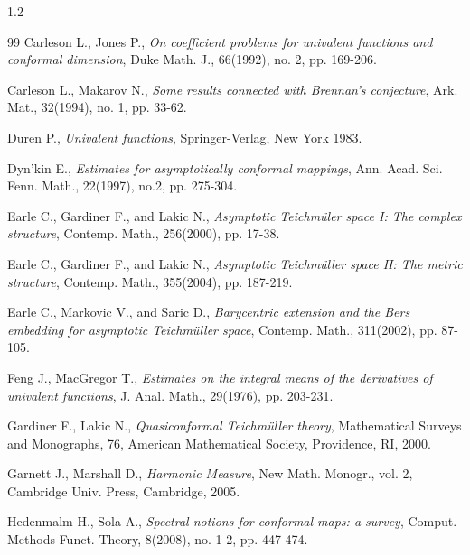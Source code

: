 \documentclass[11pt]{amsart}
\theoremstyle{remark}
\theoremstyle{claim}
\theoremstyle{definition}
\theoremstyle{problem}
\theoremstyle{conjecture}
\theoremstyle{question}
\numberwithin{equation}{section}
\begin{document}
\begin{spacing}{1.2}
\begin{thebibliography}{99}
Carleson L., Jones P., {\em On coefficient problems for univalent functions and conformal 
dimension},  Duke Math. J.,  66(1992), no. 2, pp. 169-206.

Carleson L., Makarov N.,  {\em Some results connected with Brennan's conjecture},  Ark. Mat., 32(1994), no. 1, pp. 33-62.



 Duren P., {\em Univalent functions}, Springer-Verlag, New York 1983.

 Dyn'kin E., {\em Estimates for asymptotically conformal mappings},  Ann. Acad. Sci. Fenn. Math., 22(1997), no.2, pp. 275-304.

Earle C., Gardiner F., and Lakic N., {\em Asymptotic Teichm\"uler space I: The complex structure},  Contemp. Math.,  256(2000), pp. 17-38.

Earle C., Gardiner F., and Lakic N., {\em Asymptotic Teichm\"uller space II: The metric structure}, Contemp. Math., 355(2004), pp. 187-219.

Earle C., Markovic V., and Saric D., {\em Barycentric extension and the Bers embedding for asymptotic Teichm\"uller space},  Contemp. Math., 311(2002), pp. 87-105.

Feng J., MacGregor T., {\em Estimates on the integral means of the derivatives of
univalent functions}, J. Anal. Math., 29(1976), pp. 203-231.

Gardiner F., Lakic N., {\em Quasiconformal Teichm\"uller theory}, Mathematical Surveys and Monographs, 76,  American Mathematical Society, Providence, RI, 2000.



Garnett J., Marshall D., {\em Harmonic Measure}, New Math. Monogr., vol. 2, Cambridge Univ. Press, Cambridge, 2005.

Hedenmalm H.,  Sola A., {\em Spectral notions for conformal maps: a survey}, Comput. Methods Funct. Theory,  8(2008), no. 1-2, pp. 447-474.


\end{thebibliography}
\end{spacing}
\end{document}
